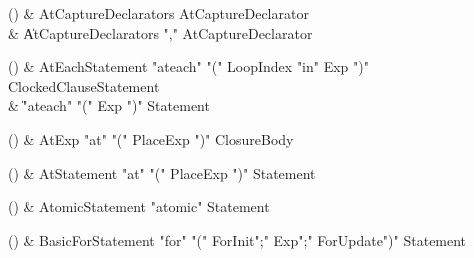 \begin{bbgrammarappendix}

() & AtCaptureDeclarators \label{prod:AtCaptureDeclarators}  \: AtCaptureDeclarator  \\

 &    \| AtCaptureDeclarators \xcd"," AtCaptureDeclarator \\

\end{bbgrammarappendix}

\begin{bbgrammarappendix}

() & AtEachStatement \label{prod:AtEachStatement}  \: \xcd"ateach" \xcd"(" LoopIndex \xcd"in" Exp \xcd")" ClockedClause\opt Statement  \\

 &    \| \xcd"ateach" \xcd"(" Exp \xcd")" Statement \\

\end{bbgrammarappendix}

\begin{bbgrammarappendix}

() & AtExp \label{prod:AtExp}  \: \xcd"at" \xcd"(" PlaceExp \xcd")" ClosureBody  \\


\end{bbgrammarappendix}

\begin{bbgrammarappendix}

() & AtStatement \label{prod:AtStatement}  \: \xcd"at" \xcd"(" PlaceExp \xcd")" Statement  \\


\end{bbgrammarappendix}

\begin{bbgrammarappendix}

() & AtomicStatement \label{prod:AtomicStatement}  \: \xcd"atomic" Statement  \\


\end{bbgrammarappendix}

\begin{bbgrammarappendix}

() & BasicForStatement \label{prod:BasicForStatement}  \: \xcd"for" \xcd"(" ForInit\opt \xcd";" Exp\opt \xcd";" ForUpdate\opt \xcd")" Statement  \\


\end{bbgrammarappendix}


